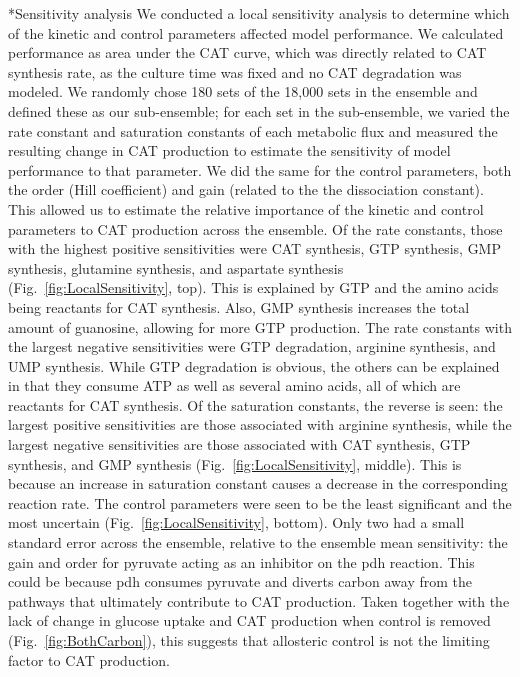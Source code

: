 \documentclass[12pt]{article}
\makeatletter
\renewcommand\subsection{\@startsection
	{subsection}{2}{0mm}
	{-0.05in}
	{-0.5\baselineskip}
	{\normalfont\normalsize\bfseries}}
\makeatother
\begin{document}
\subsection*{Sensitivity analysis}
We conducted a local sensitivity analysis to determine which of the kinetic and control parameters affected model performance.
We calculated performance as area under the CAT curve, which was directly related to CAT synthesis rate, as the culture time was fixed and no CAT degradation was modeled.
We randomly chose 180 sets of the 18,000 sets in the ensemble and defined these as our sub-ensemble; for each set in the sub-ensemble, we varied the rate constant and saturation constants of each metabolic flux and measured the resulting change in CAT production to estimate the sensitivity of model performance to that parameter.
We did the same for the control parameters, both the order (Hill coefficient) and gain (related to the the dissociation constant).
This allowed us to estimate the relative importance of the kinetic and control parameters to CAT production across the ensemble.
Of the rate constants, those with the highest positive sensitivities were CAT synthesis, GTP synthesis, GMP synthesis, glutamine synthesis, and aspartate synthesis (Fig.~\ref{fig:LocalSensitivity}, top).
This is explained by GTP and the amino acids being reactants for CAT synthesis.
Also, GMP synthesis increases the total amount of guanosine, allowing for more GTP production.
The rate constants with the largest negative sensitivities were GTP degradation, arginine synthesis, and UMP synthesis.
While GTP degradation is obvious, the others can be explained in that they consume ATP as well as several amino acids, all of which are reactants for CAT synthesis.
Of the saturation constants, the reverse is seen: the largest positive sensitivities are those associated with arginine synthesis, while the largest negative sensitivities are those associated with CAT synthesis, GTP synthesis, and GMP synthesis (Fig.~\ref{fig:LocalSensitivity}, middle).
This is because an increase in saturation constant causes a decrease in the corresponding reaction rate.
The control parameters were seen to be the least significant and the most uncertain (Fig.~\ref{fig:LocalSensitivity}, bottom).
Only two had a small standard error across the ensemble, relative to the ensemble mean sensitivity: the gain and order for pyruvate acting as an inhibitor on the pdh reaction.
This could be because pdh consumes pyruvate and diverts carbon away from the pathways that ultimately contribute to CAT production.
Taken together with the lack of change in glucose uptake and CAT production when control is removed (Fig.~\ref{fig:BothCarbon}), this suggests that allosteric control is not the limiting factor to CAT production.
\end{document}
